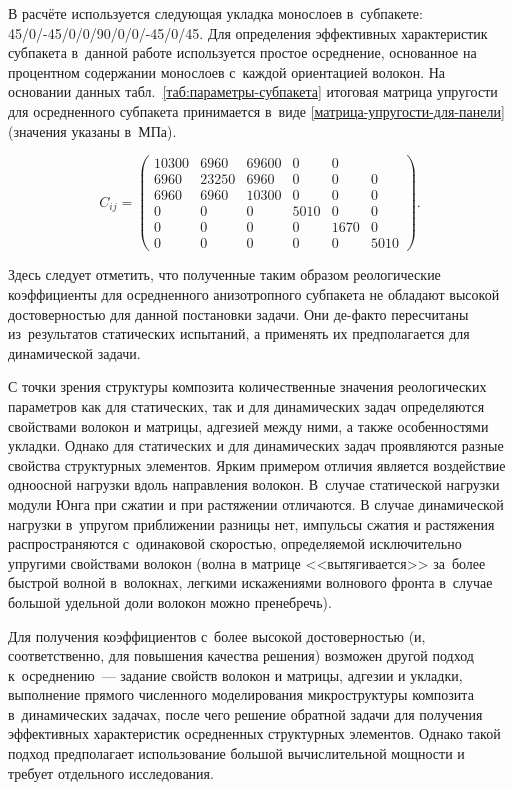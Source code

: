 \documentclass[thesis.tex]{subfiles}
\begin{document}
\newpage
В расчёте используется следующая укладка монослоев в~субпакете:
45\degree/0\degree/-45\degree/0\degree/0\degree/90\degree/0\degree/0\degree/-45\degree/0\degree/45\degree.
Для определения эффективных характеристик субпакета в~данной работе используется простое осреднение, основанное на
процентном содержании монослоев с~каждой ориентацией волокон. На основании данных табл.~\ref{таб:параметры-субпакета}
итоговая матрица упругости для осредненного субпакета принимается в~виде \eqref{матрица-упругости-для-панели} (значения
указаны в~МПа).

\begin{equation}
    C_{ij} = \begin{pmatrix}
    10300 & 6960 & 6960 0 & 0 & 0 \\
    6960 & 23250 & 6960 & 0 & 0 & 0 \\
    6960 & 6960 & 10300 & 0 & 0 & 0 \\
    0 & 0 & 0 & 5010 & 0 & 0 \\
    0 & 0 & 0 & 0 & 1670 & 0 \\
    0 & 0 & 0 & 0 & 0 & 5010
    \end{pmatrix}.
    \label{матрица-упругости-для-панели}
\end{equation}

Здесь следует отметить, что полученные таким образом реологические коэффициенты для осредненного анизотропного субпакета
не обладают высокой достоверностью для данной постановки задачи. Они де-факто пересчитаны из~результатов статических
испытаний, а применять их предполагается для динамической задачи.

С точки зрения структуры композита количественные значения реологических параметров как для статических, так и для
динамических задач определяются свойствами волокон и матрицы, адгезией между ними, а также особенностями укладки.
Однако для статических и для динамических задач проявляются разные свойства структурных элементов. Ярким примером
отличия является воздействие одноосной нагрузки вдоль направления волокон. В~случае статической нагрузки модули Юнга при
сжатии и при растяжении отличаются. В случае динамической нагрузки в~упругом приближении разницы нет, импульсы сжатия и
растяжения распространяются с~одинаковой скоростью, определяемой исключительно упругими свойствами волокон (волна в
матрице <<вытягивается>> за~более быстрой волной в~волокнах, легкими искажениями волнового фронта в~случае большой
удельной доли волокон можно пренебречь).

Для получения коэффициентов с~более высокой достоверностью (и, соответственно, для повышения качества решения) возможен
другой подход к~осреднению~--- задание свойств волокон и матрицы, адгезии и укладки, выполнение прямого численного
моделирования микроструктуры композита в~динамических задачах, после чего решение обратной задачи для получения
эффективных характеристик осредненных структурных элементов. Однако такой подход предполагает использование большой
вычислительной мощности и требует отдельного исследования.
\end{document}
